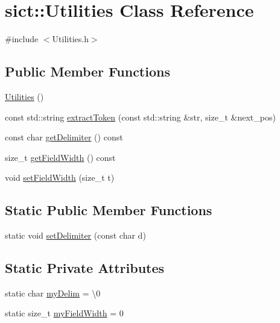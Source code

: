 \hypertarget{classsict_1_1Utilities}{}\section{sict\+::Utilities Class Reference}
\label{classsict_1_1Utilities}


{\ttfamily \#include $<$Utilities.\+h$>$}

\subsection*{Public Member Functions}
\begin{DoxyCompactItemize}
\item 
\mbox{\hyperlink{classsict_1_1Utilities_a2e0687de6ca32d2dbe8c1a4a26eb96ed}{Utilities}} ()
\item 
const std\+::string \mbox{\hyperlink{classsict_1_1Utilities_adf1116c6b7b95d9bfb3f8e1a24065703}{extract\+Token}} (const std\+::string \&str, size\+\_\+t \&next\+\_\+pos)
\item 
const char \mbox{\hyperlink{classsict_1_1Utilities_acb2dd78a1790aea2af76bda8235d05e0}{get\+Delimiter}} () const
\item 
size\+\_\+t \mbox{\hyperlink{classsict_1_1Utilities_a63f80ab99e3b0f5521d64d24366f59ba}{get\+Field\+Width}} () const
\item 
void \mbox{\hyperlink{classsict_1_1Utilities_a3c0800c247dd955f57eff973cbe12b0b}{set\+Field\+Width}} (size\+\_\+t t)
\end{DoxyCompactItemize}
\subsection*{Static Public Member Functions}
\begin{DoxyCompactItemize}
\item 
static void \mbox{\hyperlink{classsict_1_1Utilities_aebf6a66e41ce8de47d0a8aa7a4e6165b}{set\+Delimiter}} (const char d)
\end{DoxyCompactItemize}
\subsection*{Static Private Attributes}
\begin{DoxyCompactItemize}
\item 
static char \mbox{\hyperlink{classsict_1_1Utilities_a1b03541cbef61c81b0b5a7197fb76f46}{my\+Delim}} = \textquotesingle{}\textbackslash{}0\textquotesingle{}
\item 
static size\+\_\+t \mbox{\hyperlink{classsict_1_1Utilities_adeda8c6cf3e8bdaf19c6b3b3a011e016}{my\+Field\+Width}} = 0
\end{DoxyCompactItemize}


